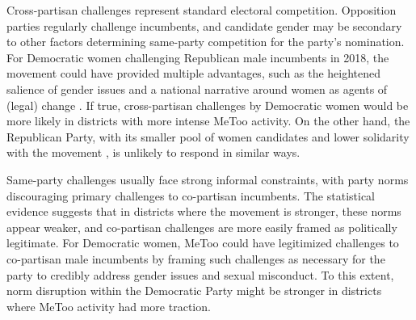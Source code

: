 \documentclass[manuscript,screen,nonacm,11pt,acm]{acmart}
\begin{document}
Cross-partisan challenges represent standard electoral competition.
Opposition parties regularly challenge incumbents, and candidate gender may be secondary to other factors determining same-party competition for the party's nomination.
For Democratic women challenging Republican male incumbents in 2018, the movement could have provided multiple advantages, such as the heightened salience of gender issues and a national narrative around women as agents of (legal) change \citep[][see also \cref{sm:legal}]{Tippett2018, tippett2018-bi, nyt2018}.
If true, cross-partisan challenges by Democratic women would be more likely in districts with more intense MeToo activity.
On the other hand, the Republican Party, with its smaller pool of women candidates \citep{thomsen2020} and lower solidarity with the movement \citep{dittmar2020}, is unlikely to respond in similar ways.

Same-party challenges usually face strong informal constraints, with party norms discouraging primary challenges to co-partisan incumbents.
The statistical evidence suggests that in districts where the movement is stronger, these norms appear weaker, and co-partisan challenges are more easily framed as politically legitimate.
For Democratic women, MeToo could have legitimized challenges to co-partisan male incumbents by framing such challenges as necessary for the party to credibly address gender issues and sexual misconduct.
To this extent, norm disruption within the Democratic Party might be stronger in districts where MeToo activity had more traction.

\end{document}
